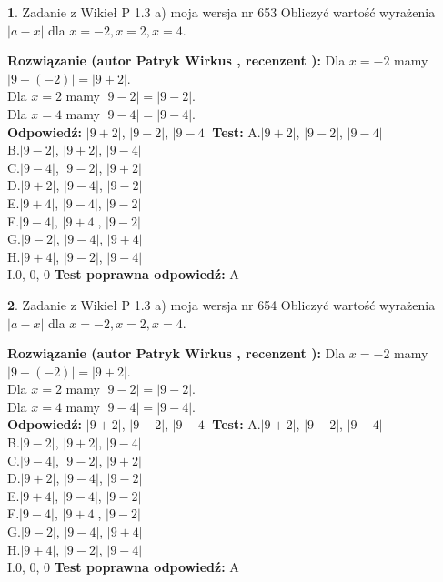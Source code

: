 \documentclass[12pt, a4paper]{article}
\theoremstyle{definition} %
\newtheorem{zad}{}
\newcommand{\zadStart}[1]{\begin{zad}#1\newline}
\newcommand{\zadStop}{\end{zad}}
\newcommand{\rozwStart}[2]{\noindent \textbf{Rozwiązanie (autor #1 , recenzent #2): }\newline}
\newcommand{\rozwStop}{\newline}
\newcommand{\odpStart}{\noindent \textbf{Odpowiedź:}\newline}
\newcommand{\odpStop}{\newline}
\newcommand{\testStart}{\noindent \textbf{Test:}\newline}
\newcommand{\testStop}{\newline}
\newcommand{\kluczStart}{\noindent \textbf{Test poprawna odpowiedź:}\newline}
\newcommand{\kluczStop}{\newline}
\begin{document}
\zadStart{Zadanie z Wikieł P 1.3 a) moja wersja nr 653}
Obliczyć wartość wyrażenia $|a - x|$ dla $x=-2,x=2,x=4$.
\zadStop
\rozwStart{Patryk Wirkus}{}
Dla $x = -2$ mamy $|9 - (-2)| = |9 + 2|$.\\
Dla $x = 2$ mamy $|9 - 2| = |9 - 2|$.\\
Dla $x = 4$ mamy $|9 - 4| = |9 - 4|$.\\
\rozwStop
\odpStart
$|9 + 2|$, $|9 - 2|$, $|9 - 4|$
\odpStop
\testStart
A.$|9 + 2|$, $|9 - 2|$, $|9 - 4|$\\
B.$|9 - 2|$, $|9 + 2|$, $|9 - 4|$\\
C.$|9 - 4|$, $|9 - 2|$, $|9 + 2|$\\
D.$|9 + 2|$, $|9 - 4|$, $|9 - 2|$\\
E.$|9 + 4|$, $|9 - 4|$, $|9 - 2|$\\
F.$|9 - 4|$, $|9 + 4|$, $|9 - 2|$\\
G.$|9 - 2|$, $|9 - 4|$, $|9 + 4|$\\
H.$|9 + 4|$, $|9 - 2|$, $|9 - 4|$\\
I.$0$, $0$, $0$
\testStop
\kluczStart
A
\kluczStop



\zadStart{Zadanie z Wikieł P 1.3 a) moja wersja nr 654}
Obliczyć wartość wyrażenia $|a - x|$ dla $x=-2,x=2,x=4$.
\zadStop
\rozwStart{Patryk Wirkus}{}
Dla $x = -2$ mamy $|9 - (-2)| = |9 + 2|$.\\
Dla $x = 2$ mamy $|9 - 2| = |9 - 2|$.\\
Dla $x = 4$ mamy $|9 - 4| = |9 - 4|$.\\
\rozwStop
\odpStart
$|9 + 2|$, $|9 - 2|$, $|9 - 4|$
\odpStop
\testStart
A.$|9 + 2|$, $|9 - 2|$, $|9 - 4|$\\
B.$|9 - 2|$, $|9 + 2|$, $|9 - 4|$\\
C.$|9 - 4|$, $|9 - 2|$, $|9 + 2|$\\
D.$|9 + 2|$, $|9 - 4|$, $|9 - 2|$\\
E.$|9 + 4|$, $|9 - 4|$, $|9 - 2|$\\
F.$|9 - 4|$, $|9 + 4|$, $|9 - 2|$\\
G.$|9 - 2|$, $|9 - 4|$, $|9 + 4|$\\
H.$|9 + 4|$, $|9 - 2|$, $|9 - 4|$\\
I.$0$, $0$, $0$
\testStop
\kluczStart
A
\kluczStop
\end{document}
